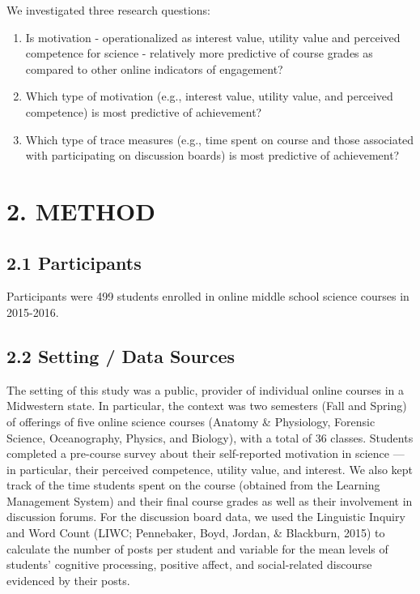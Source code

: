 \documentclass[acmart]{apa6}
\providecommand{\tightlist}{%
  \setlength{\itemsep}{0pt}\setlength{\parskip}{0pt}}
\theoremstyle{definition}
\theoremstyle{definition}
\theoremstyle{definition}
\theoremstyle{remark}
\begin{document}
We investigated three research questions:

\begin{enumerate}
\def\labelenumi{\arabic{enumi}.}
\tightlist
\item
  Is motivation - operationalized as interest value, utility value and
  perceived competence for science - relatively more predictive of
  course grades as compared to other online indicators of engagement?
\item
  Which type of motivation (e.g., interest value, utility value, and
  perceived competence) is most predictive of achievement?
\item
  Which type of trace measures (e.g., time spent on course and those
  associated with participating on discussion boards) is most predictive
  of achievement?
\end{enumerate}

\section{2. METHOD}\label{method}

\subsection{2.1 Participants}\label{participants}

Participants were 499 students enrolled in online middle school science
courses in 2015-2016.

\subsection{2.2 Setting / Data Sources}\label{setting-data-sources}

The setting of this study was a public, provider of individual online
courses in a Midwestern state. In particular, the context was two
semesters (Fall and Spring) of offerings of five online science courses
(Anatomy \& Physiology, Forensic Science, Oceanography, Physics, and
Biology), with a total of 36 classes. Students completed a pre-course
survey about their self-reported motivation in science --- in
particular, their perceived competence, utility value, and interest. We
also kept track of the time students spent on the course (obtained from
the Learning Management System) and their final course grades as well as
their involvement in discussion forums. For the discussion board data,
we used the Linguistic Inquiry and Word Count (LIWC; Pennebaker, Boyd,
Jordan, \& Blackburn, 2015) to calculate the number of posts per student
and variable for the mean levels of students' cognitive processing,
positive affect, and social-related discourse evidenced by their posts.
\end{document}
